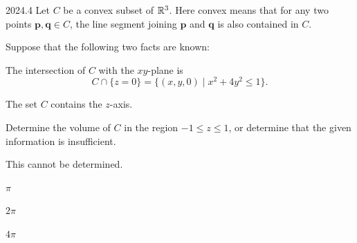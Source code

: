     \begin{pastproblem}{2024.4}
        Let $C$ be a convex subset of $\mathbb{R}^3$. Here convex means that for any two points
        $\mathbf{p},\mathbf{q}\in C$, the line segment joining $\mathbf{p}$ and $\mathbf{q}$ is also
        contained in $C$.

        Suppose that the following two facts are known:
        \begin{problemchoices}
            \item The intersection of $C$ with the $xy$-plane is
                  \[
                      C\cap\{z=0\}
                      =
                      \{(x,y,0)\mid x^2+4y^2\leq 1\}.
                  \]
            \item The set $C$ contains the $z$-axis.
        \end{problemchoices}
        Determine the volume of $C$ in the region $-1\leq z\leq 1$, or determine that the given
        information is insufficient.
        \begin{problemchoices}
            \item This cannot be determined.
            \item $\pi$
            \item $2\pi$
            \item $4\pi$
        \end{problemchoices}
    \end{pastproblem}


